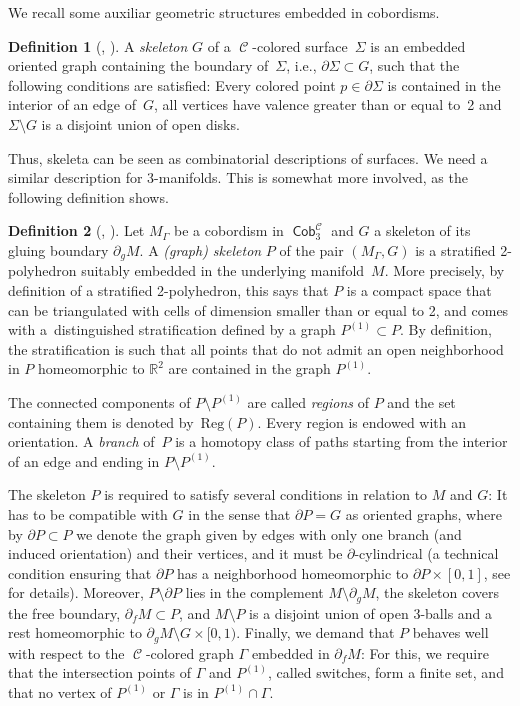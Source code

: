\documentclass[pdftex]{sigma}
\DeclareMathOperator{\Cob}{\mathsf{Cob}}
\DeclareMathOperator{\calc}{\mathcal{C}}
\numberwithin{equation}{section}
\theoremstyle{definition}
\newtheorem{Definition}[Definition]{Definition}
\begin{document}
We recall some auxiliar geometric structures embedded in cobordisms.
\begin{Definition}[{\cite[Definition~4.2.13]{F}, \cite[Section~15.7.1]{TV}}]
 \label{defSkel}
 A \textit{skeleton} $G$ of a $\calc$-colored surface~$\Sigma$ is an embedded oriented graph containing the boundary of~$\Sigma$, i.e., $\partial \Sigma \subset G$, such that the following conditions are satisfied: Every colored point $p \in \partial\Sigma$ is contained in the interior of an edge of~$G$, all vertices have valence greater than or equal to~2 and $\Sigma \setminus G$ is a disjoint union of open disks.
\end{Definition}
Thus, skeleta can be seen as combinatorial descriptions of surfaces. We need a similar description for 3-manifolds. This is somewhat more involved, as the following definition shows.
\begin{Definition}[{\cite[Definitions 4.2.17 and 4.2.18]{F}, \cite[Sections 11.1.2 and 11.5.1]{TV}}]
 \label{defGraphSkel}
 Let $M_{\Gamma}$ be a cobordism in $\Cob_3^{\calc}$ and $G$ a skeleton of its gluing boundary $\partial_gM$. A \textit{(graph) skeleton} $P$ of the pair $(M_{\Gamma}, G)$ is a stratified 2-polyhedron suitably embedded in the underlying mani\-fold~$M$. More precisely, by definition of a stratified 2-polyhedron, this says that $P$ is a compact space that can be triangulated with cells of dimension smaller than or equal to 2, and comes with a~distinguished stratification defined by a graph $P^{(1)} \subset P$. By definition, the stratification is such that all points that do not admit an open neighborhood in $P$ homeomorphic to $\mathbb{R}^2$ are contained in the graph $P^{(1)}$.

The connected components of $P\setminus P^{(1)}$ are called \textit{regions} of $P$ and the set containing them is denoted by~$\mathrm{Reg}(P)$.
Every region is endowed with an orientation.
A \textit{branch} of~$P$ is a homotopy class of paths starting from the interior of an edge and ending in $P \setminus P^{(1)}$.

 The skeleton $P$ is required to satisfy several conditions in relation to $M$ and $G$: It has to be compatible with $G$ in the sense that $\partial P = G$ as oriented graphs, where by $\partial P \subset P$ we denote the graph given by edges with only one branch (and induced orientation) and their vertices, and it must be $\partial$-cylindrical (a technical condition ensuring that $\partial P$ has a neighborhood homeomorphic to $\partial P \times [0,1]$, see \cite[Section~11.1.4]{TV} for details). Moreover, $P \setminus \partial P$ lies in the complement $M \setminus \partial _gM$, the skeleton covers the free boundary, $\partial _f M \subset P$, and $M \setminus P$ is a disjoint union of open 3-balls and a rest homeomorphic to $\partial_gM \setminus G \times [0,1)$. Finally, we demand that $P$ behaves well with respect to the $\calc$-colored graph $\Gamma$ embedded in $\partial_fM$: For this, we require that the intersection points of $\Gamma$ and $P^{(1)}$, called switches, form a finite set, and that no vertex of $P^{(1)}$ or $\Gamma$ is in $P^{(1)} \cap \Gamma$.
\end{Definition}
\end{document}
